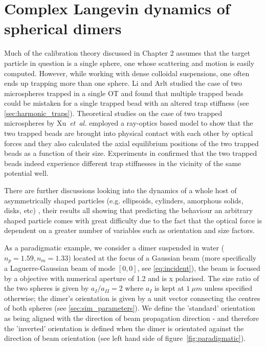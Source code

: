 \chapter{Complex Langevin dynamics of spherical dimers}
\label{chapter:langevin_dynamics}
Much of the calibration theory discussed in Chapter 2 
assumes that the target particle in question is a single 
sphere, one whose scattering and motion is easily computed. 
However, while working with dense colloidal suspensions, 
one often ends up trapping more than one sphere. Li and 
Arlt \cite{Li2008} studied the case of two microspheres 
trapped in a single OT and found that multiple trapped 
beads could be mistaken for a single trapped bead with an 
altered trap stiffness (see \ref{sec:harmonic_traps}). 
Theoretical studies on the case of two trapped microspheres 
by Xu~\textit{et~al.} \cite{Xu2005} employed a ray-optics 
based model to show that the two trapped beads are brought 
into physical contact with each other by optical forces 
and they also calculated the axial equilibrium positions 
of the two trapped beads as a function of their size. 
Experiments in \cite{Praveen2016} confirmed that the two 
trapped beads indeed experience different trap stiffnesses 
in the vicinity of the same potential well.
 
There are further discussions looking into the dynamics of 
a whole host of asymmetrically shaped particles (e.g. 
ellipsoids, cylinders, amorphous solids, disks, etc) 
\cite{Loudet2014, ShengHua2005, Chetana2022}, their results 
all showing that predicting the behaviour an arbitrary shaped 
particle comes with great difficulty due to the fact that the 
optical force is dependent on a greater number of variables 
such as orientation and size factors.

As a paradigmatic example, we consider a dimer suspended in 
water ($n_p = 1.59, n_m = 1.33$) located at the focus of 
a Gaussian beam (more specifically a Laguerre-Gaussian 
beam of mode $[0,0]$, see \eqref{eq:incident}), the beam 
is focused by a objective with numerical aperture of 1.2 
and is x polarised. The size ratio of the two spheres is 
given by $a_{I}/a_{II} = 2$ where $a_{I}$ is kept at $1\ 
\mu m$ unless specified otherwise; the dimer's orientation 
is given by a unit vector connecting the centres of both 
spheres (see \ref{sec:sim_parameters}). We define the 
'standard' orientation as being aligned with the direction 
of beam propagation direction - and therefore the 'inverted' 
orientation is defined when the dimer is orientated against 
the direction of beam orientation (see left hand side of 
figure~\ref{fig:paradigmatic}). 

